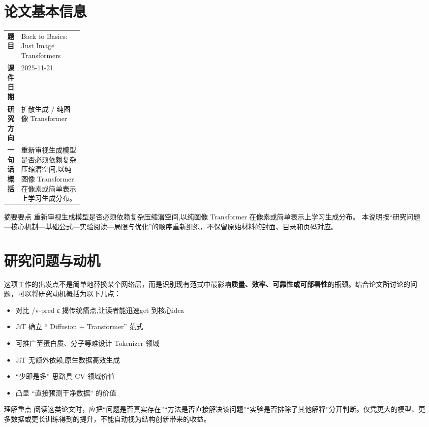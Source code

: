 \documentclass[UTF8,11pt,a4paper]{ctexart}
\newcommand{\term}[1]{\textbf{\textcolor{mainblue}{#1}}}
\begin{document}
\section{论文基本信息}
\begin{center}
\begin{tabularx}{0.94\linewidth}{>{\bfseries}p{0.18\linewidth}X}
\toprule
题目 & Back to Basics: Just Image Transformers\\
课件日期 & 2025-11-21\\
研究方向 & 扩散生成 / 纯图像 Transformer\\
一句话概括 & 重新审视生成模型是否必须依赖复杂压缩潜空间,以纯图像 Transformer 在像素或简单表示上学习生成分布。\\
\bottomrule
\end{tabularx}
\end{center}

\begin{infobox}{摘要要点}
重新审视生成模型是否必须依赖复杂压缩潜空间,以纯图像 Transformer 在像素或简单表示上学习生成分布。 本说明按“研究问题—核心机制—基础公式—实验阅读—局限与优化”的顺序重新组织，不保留原始材料的封面、目录和页码对应。
\end{infobox}

\section{研究问题与动机}
这项工作的出发点不是简单地替换某个网络层，而是识别现有范式中最影响\term{质量、效率、可靠性或可部署性}的瓶颈。结合论文所讨论的问题，可以将研究动机概括为以下几点：
\begin{itemize}
\item 对比 /v-pred ε 揭传统痛点,让读者能迅速get 到核心idea
\item JiT 确立 “ Diffusion + Transformer” 范式
\item 可推广至蛋白质、分子等难设计 Tokenizer 领域
\item JiT 无额外依赖,原生数据高效生成
\item “少即是多” 思路具 CV 领域价值
\item 凸显 “直接预测干净数据” 的价值
\end{itemize}

\begin{notebox}{理解重点}
阅读这类论文时，应把“问题是否真实存在”“方法是否直接解决该问题”“实验是否排除了其他解释”分开判断。仅凭更大的模型、更多数据或更长训练得到的提升，不能自动视为结构创新带来的收益。
\end{notebox}
\end{document}
